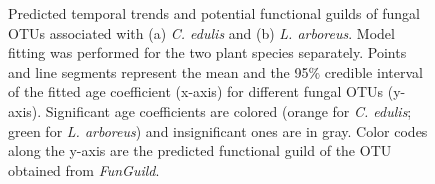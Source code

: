 \clearpage
\begin{figure}[h]	
	\vspace*{-1cm}
	\centering
	\caption[Predicted temporal trends and potential functional guilds of fungal OTUs associated with (a) \textit{C. edulis} and (b) \textit{L. arboreus}.]
	{\hspace{1mm} Predicted temporal trends and potential functional guilds of fungal OTUs associated with (a) \textit{C. edulis} and (b) \textit{L. arboreus}. Model fitting was performed for the two plant species separately. Points and line segments represent the mean and the 95$\%$ credible interval of the fitted age coefficient (x-axis) for different fungal OTUs (y-axis). Significant age coefficients are colored (orange for \textit{C. edulis}; green for \textit{L. arboreus}) and insignificant ones are in gray. Color codes along the y-axis are the predicted functional guild of the OTU obtained from \textit{FunGuild}.}
	\label{fig:Funguild_HMSC_Species_Individual_Full2015}
\end{figure}

